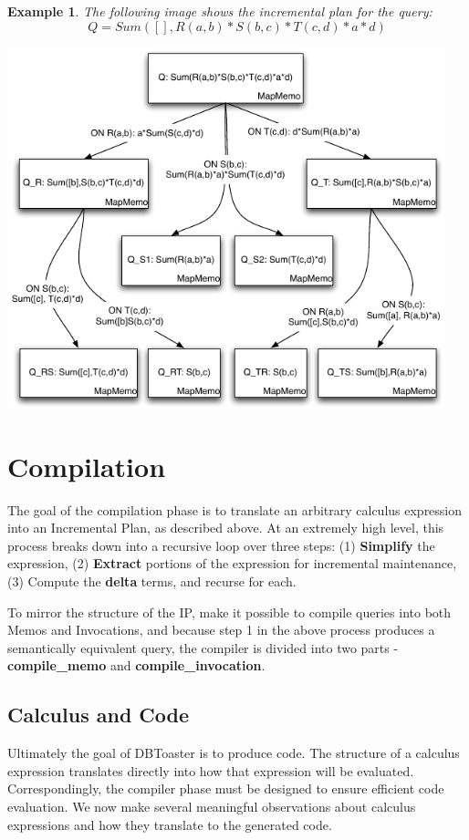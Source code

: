 \documentclass[11pt]{amsart}
\newtheorem{example}{Example}
\begin{document}
\begin{example}
The following image shows the incremental plan for the query:
$$Q = Sum([], R(a,b) * S(b,c) * T(c,d) * a * d)$$

\includegraphics[width=5.0in]{IPExample}
\end{example}

\section{Compilation}

The goal of the compilation phase is to translate an arbitrary calculus expression into an Incremental Plan, as described above.  At an extremely high level, this process breaks down into a recursive loop over three steps: (1) {\bf Simplify} the expression, (2) {\bf Extract} portions of the expression for incremental maintenance, (3) Compute the {\bf delta} terms, and recurse for each.

To mirror the structure of the IP, make it possible to compile queries into both Memos and Invocations, and because step 1 in the above process produces a semantically equivalent query, the compiler is divided into two parts - {\bf compile\_memo} and {\bf compile\_invocation}.

\subsection{Calculus and Code}

Ultimately the goal of DBToaster is to produce code.  The structure of a calculus expression translates directly into how that expression will be evaluated.  Correspondingly, the compiler phase must be designed to ensure efficient code evaluation.  We now make several meaningful observations about calculus expressions and how they translate to the generated code.
\end{document}
